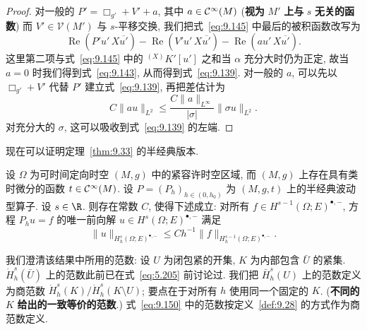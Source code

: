 \begin{proof}
对一般的 $P' = \Box_{g'} + V' + a$, 其中 $a \in \mathcal{C}^\infty(M)$ (\textbf{视为} $M'$ \textbf{上与} $s$ \textbf{无关的函数}) 而 $V' \in \mathcal{V}(M')$ 与 $s$-平移交换, 我们把式~\eqref{eq:9.145} 中最后的被积函数改写为
\begin{equation}\label{eq:9.148}
    \operatorname{Re}(P' u' \, X \overline{u'}) - \operatorname{Re}(V' u' \, X \overline{u'}) - \operatorname{Re}(a u' \, X \overline{u'}).
\end{equation}
这里第二项与式~\eqref{eq:9.145} 中的 ${}^{(X)} K'[u']$ 之和当 $\alpha$ 充分大时仍为正定, 故当 $a = 0$ 时我们得到式~\eqref{eq:9.143}, 从而得到式~\eqref{eq:9.139}. 对一般的 $a$, 可以先以 $\Box_{g'} + V'$ 代替 $P'$ 建立式~\eqref{eq:9.139}, 再把差估计为
\begin{equation}\label{eq:9.149}
    C \|a u\|_{L^2} \le \frac{C \|a\|_{L^\infty}}{|\sigma|} \|\sigma u\|_{L^2}.
\end{equation}
对充分大的 $\sigma$, 这可以吸收到式~\eqref{eq:9.139} 的左端.
\end{proof}

现在可以证明定理~\ref{thm:9.33} 的半经典版本.

\begin{theorem}[求解半经典波动型方程]\label{thm:9.45}
设 $\Omega$ 为可时间定向时空 $(M, g)$ 中的紧容许时空区域, 而 $(M, g)$ 上存在具有类时微分的函数 $t \in \mathcal{C}^\infty(M)$. 设 $P = (P_h)_{h \in (0, h_0)}$ 为 $(M, g, t)$ 上的半经典波动型算子. 设 $s \in \R$. 则存在常数 $C$, 使得下述成立: 对所有 $f \in H^{s-1}(\Omega; E)^{\bullet,-}$, 方程 $P_h u = f$ 的唯一前向解 $u \in H^s(\Omega; E)^{\bullet,-}$ 满足
\begin{equation}\label{eq:9.150}
    \|u\|_{H_h^s(\Omega; E)^{\bullet,-}} \le C h^{-1} \|f\|_{H_h^{s-1}(\Omega; E)^{\bullet,-}}.
\end{equation}
\end{theorem}

我们澄清该结果中所用的范数: 设 $U$ 为闭包紧的开集, $K$ 为内部包含 $\bar U$ 的紧集. $\dot{H}_h^s(\bar U)$ 上的范数此前已在式~\eqref{eq:5.205} 前讨论过. 我们把 $\bar{H}_h^s(U)$ 上的范数定义为商范数 $\dot{H}_h^s(K)/\dot{H}_h^s(K \setminus U)$; 要点在于对所有 $h$ 使用同一个固定的 $K$. (\textbf{不同的} $K$ \textbf{给出的一致等价的范数}.) 式~\eqref{eq:9.150} 中的范数按定义~\ref{def:9.28} 的方式作为商范数定义.

